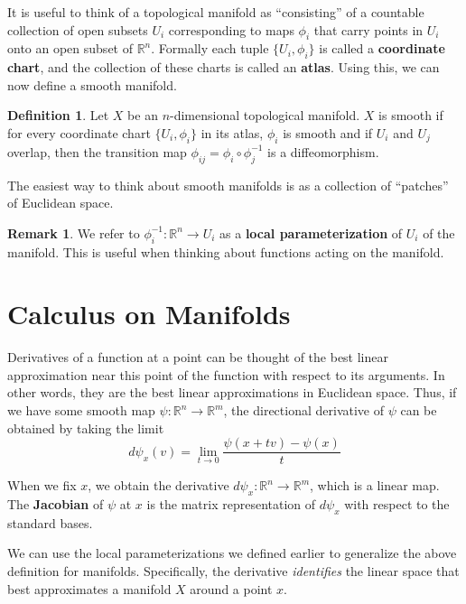 \documentclass[reqno]{amsart}
\theoremstyle{definition}
\newtheorem{defn}{Definition}[section]
\newtheorem{rem}{Remark}[section]
\numberwithin{equation}{section}
\begin{document}
It is useful to think of a topological manifold as ``consisting'' of a countable collection of open subsets $U_i$ corresponding to maps $\phi_i$ that carry points in $U_i$ onto an open subset of $\mathbb{R}^n$. Formally each tuple $\{U_i, \phi_i\}$ is called a \textbf{coordinate chart}, and the collection of these charts is called an \textbf{atlas}. Using this, we can now define a smooth manifold.

\begin{defn}
    Let $X$ be an $n$-dimensional topological manifold. $X$ is smooth if for every coordinate chart $\{U_i, \phi_i\}$ in its atlas, $\phi_i$ is smooth and if $U_i$ and $U_j$ overlap, then the transition map $\phi_{ij} = \phi_i \circ \phi_j^{-1}$ is a diffeomorphism.
\end{defn}

The easiest way to think about smooth manifolds is as a collection of ``patches'' of Euclidean space.

\begin{rem}
    We refer to $\phi_i^{-1}: \mathbb{R}^n \to U_i$ as a \textbf{local parameterization} of $U_i$ of the manifold. This is useful when thinking about functions acting on the manifold.
\end{rem}

\section{Calculus on Manifolds}

Derivatives of a function at a point can be thought of the best linear approximation near this point of the function with respect to its arguments. In other words, they are the best linear approximations in Euclidean space. Thus, if we have some smooth map $\psi: \mathbb{R}^n \to \mathbb{R}^m$, the directional derivative of $\psi$ can be obtained by taking the limit
\begin{equation*}
    d\psi_x(v) = \lim_{t \to 0}\frac{\psi(x + tv) - \psi(x)}{t}
\end{equation*}

When we fix $x$, we obtain the derivative $d\psi_x: \mathbb{R}^n \to \mathbb{R}^m$, which is a linear map. The \textbf{Jacobian} of $\psi$ at $x$ is the matrix representation of $d\psi_x$ with respect to the standard bases. 

We can use the local parameterizations we defined earlier to generalize the above definition for manifolds. Specifically, the derivative \textit{identifies} the linear space that best approximates a manifold $X$ around a point $x$.
\end{document}
